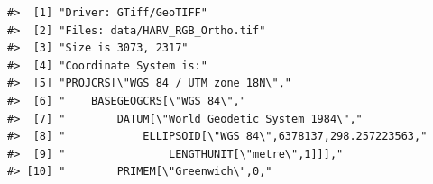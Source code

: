 \documentclass[
]{book}
\begin{document}
\begin{verbatim}
#>  [1] "Driver: GTiff/GeoTIFF"                                                                                                                                                                                                                                                          
#>  [2] "Files: data/HARV_RGB_Ortho.tif"                                                                                                                                                                                                                                                 
#>  [3] "Size is 3073, 2317"                                                                                                                                                                                                                                                             
#>  [4] "Coordinate System is:"                                                                                                                                                                                                                                                          
#>  [5] "PROJCRS[\"WGS 84 / UTM zone 18N\","                                                                                                                                                                                                                                             
#>  [6] "    BASEGEOGCRS[\"WGS 84\","                                                                                                                                                                                                                                                    
#>  [7] "        DATUM[\"World Geodetic System 1984\","                                                                                                                                                                                                                                  
#>  [8] "            ELLIPSOID[\"WGS 84\",6378137,298.257223563,"                                                                                                                                                                                                                        
#>  [9] "                LENGTHUNIT[\"metre\",1]]],"                                                                                                                                                                                                                                     
#> [10] "        PRIMEM[\"Greenwich\",0,"                                                                                                                                                                                                                                                

\end{verbatim}
\end{document}
